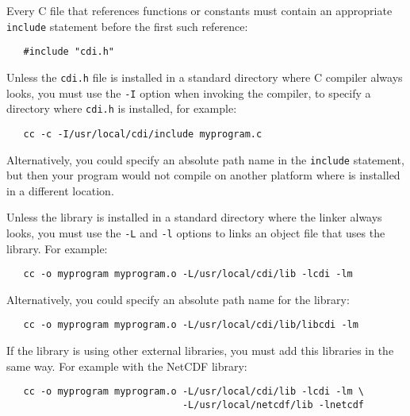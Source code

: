 Every C file that references {\CDI} functions or constants must contain
an appropriate \texttt{include} statement before the first such reference:

\begin{verbatim}
   #include "cdi.h"
\end{verbatim}

Unless the \texttt{cdi.h} file is installed in a standard directory where
C compiler always looks, you must use the \texttt{-I} option when invoking
the compiler, to specify a directory where \texttt{cdi.h} is installed, for example:

\begin{verbatim}
   cc -c -I/usr/local/cdi/include myprogram.c
\end{verbatim}

Alternatively, you could specify an absolute path name in the \texttt{include}
statement, but then your program would not compile on another platform
where {\CDI} is installed in a different location.

Unless the {\CDI} library is installed in a standard directory where the linker
always looks, you must use the \texttt{-L} and \texttt{-l} options to links an object file that
uses the {\CDI} library. For example:

\begin{verbatim}
   cc -o myprogram myprogram.o -L/usr/local/cdi/lib -lcdi -lm
\end{verbatim}

Alternatively, you could specify an absolute path name for the library:

\begin{verbatim}
   cc -o myprogram myprogram.o -L/usr/local/cdi/lib/libcdi -lm
\end{verbatim}

If the {\CDI} library is using other external libraries, you must add this
libraries in the same way.
For example with the NetCDF library:

\begin{verbatim}
   cc -o myprogram myprogram.o -L/usr/local/cdi/lib -lcdi -lm \
                               -L/usr/local/netcdf/lib -lnetcdf
\end{verbatim}
